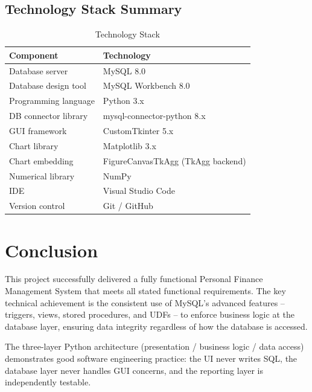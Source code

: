 \documentclass[12pt, a4paper]{article}
\begin{document}
\subsection{Technology Stack Summary}

\begin{table}[H]
\centering
\caption{Technology Stack}
\begin{tabular}{ll}
\toprule
\textbf{Component} & \textbf{Technology} \\
\midrule
Database server        & MySQL 8.0 \\
Database design tool   & MySQL Workbench 8.0 \\
Programming language   & Python 3.x \\
DB connector library   & mysql-connector-python 8.x \\
GUI framework          & CustomTkinter 5.x \\
Chart library          & Matplotlib 3.x \\
Chart embedding        & FigureCanvasTkAgg (TkAgg backend) \\
Numerical library      & NumPy \\
IDE                    & Visual Studio Code \\
Version control        & Git / GitHub \\
\bottomrule
\end{tabular}
\end{table}

\newpage

\section{Conclusion}

This project successfully delivered a fully functional Personal Finance Management
System that meets all stated functional requirements. The key technical achievement is
the consistent use of MySQL's advanced features -- triggers, views, stored procedures,
and UDFs -- to enforce business logic at the database layer, ensuring data integrity
regardless of how the database is accessed.

The three-layer Python architecture (presentation / business logic / data access)
demonstrates good software engineering practice: the UI never writes SQL, the database
layer never handles GUI concerns, and the reporting layer is independently testable.
\end{document}
